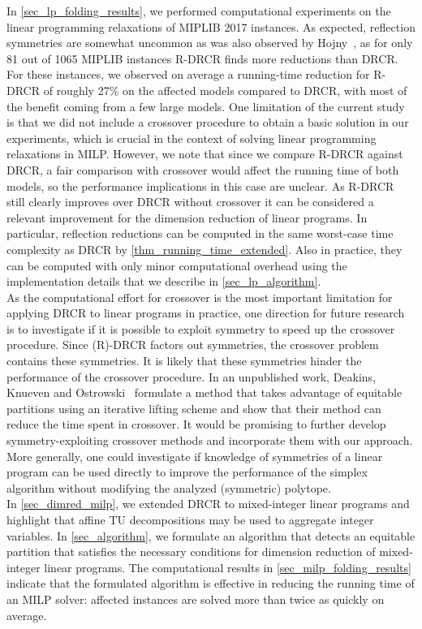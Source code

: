 \documentclass[pdflatex,sn-mathphys-num]{sn-jnl}%
\theoremstyle{thmstyleone}%
\theoremstyle{thmstylethree}%
\theoremstyle{thmstyletwo}%
\begin{document}
 In \cref{sec_lp_folding_results}, we performed computational experiments on the linear programming relaxations of MIPLIB 2017 instances. As expected, reflection symmetries are somewhat uncommon as was also observed by Hojny~\cite{Hojny2025-si}, as for only 81 out of 1065 MIPLIB instances R-DRCR finds more reductions than DRCR. For these instances, we observed on average a running-time reduction for R-DRCR of roughly 27\% on the affected models compared to DRCR, with most of the benefit coming from a few large models. One limitation of the current study is that we did not include a crossover procedure to obtain a basic solution in our experiments, which is crucial in the context of solving linear programming relaxations in MILP. However, we note that since we compare R-DRCR against DRCR, a fair comparison with crossover would affect the running time of both models, so the performance implications in this case are unclear. As R-DRCR still clearly improves over DRCR without crossover it can be considered a relevant improvement for the dimension reduction of linear programs. In particular, reflection reductions can be computed in the same worst-case time complexity as DRCR by \cref{thm_running_time_extended}. Also in practice, they can be computed with only minor computational overhead using the implementation details that we describe in \cref{sec_lp_algorithm}. \\

 As the computational effort for crossover is the most important limitation for applying DRCR to linear programs in practice, one direction for future research is to investigate if it is possible to exploit symmetry to speed up the crossover procedure. Since (R)-DRCR factors out symmetries, the crossover problem contains these symmetries. It is likely that these symmetries hinder the performance of the crossover procedure. In an unpublished work, Deakins, Knueven and Ostrowski~\cite{Deakins2022} formulate a method that takes advantage of equitable partitions using an iterative lifting scheme and show that their method can reduce the time spent in crossover. It would be promising to further develop symmetry-exploiting crossover methods and incorporate them with our approach.
 More generally, one could investigate if knowledge of symmetries of a linear program can be used directly to improve the performance of the simplex algorithm without modifying the analyzed (symmetric) polytope.\\

In \cref{sec_dimred_milp}, we extended DRCR to mixed-integer linear programs and highlight that affine TU decompositions may be used to aggregate integer variables. In \cref{sec_algorithm}, we formulate an algorithm that detects an equitable partition that satisfies the necessary conditions for dimension reduction of mixed-integer linear programs. The computational results in \cref{sec_milp_folding_results} indicate that the formulated algorithm is effective in reducing the running time of an MILP solver: affected instances are solved more than twice as quickly on average.\\
\end{document}
